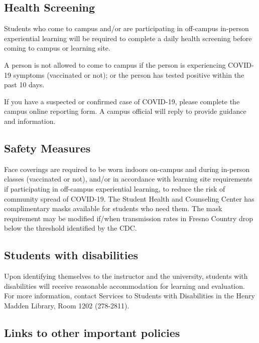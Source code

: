\hypertarget{sec:health-screening}{%
\subsection{Health Screening}\label{sec:health-screening}}

Students who come to campus and/or are participating in off-campus
in-person experiential learning will be required to complete a daily
health screening before coming to campus or learning site.

A person is not allowed to come to campus if the person is experiencing
COVID-19 symptoms (vaccinated or not); or the person has tested positive
within the past 10 days.

If you have a suspected or confirmed case of COVID-19, please complete
the campus online reporting form. A campus official will reply to
provide guidance and information.

\hypertarget{sec:safety-measures}{%
\subsection{Safety Measures}\label{sec:safety-measures}}

Face coverings are required to be worn indoors on-campus and during
in-person classes (vaccinated or not), and/or in accordance with
learning site requirements if participating in off-campus experiential
learning, to reduce the risk of community spread of COVID-19. The
Student Health and Counseling Center has complimentary masks available
for students who need them. The mask requirement may be modified if/when
transmission rates in Fresno Country drop below the threshold identified
by the CDC.

\hypertarget{sec:students-with-disabilities}{%
\subsection{Students with
disabilities}\label{sec:students-with-disabilities}}

Upon identifying themselves to the instructor and the university,
students with disabilities will receive reasonable accommodation for
learning and evaluation. For more information, contact Services to
Students with Disabilities in the Henry Madden Library, Room 1202
(278-2811).

\hypertarget{sec:links-to-other-important-policies}{%
\subsection{Links to other important
policies}\label{sec:links-to-other-important-policies}}

